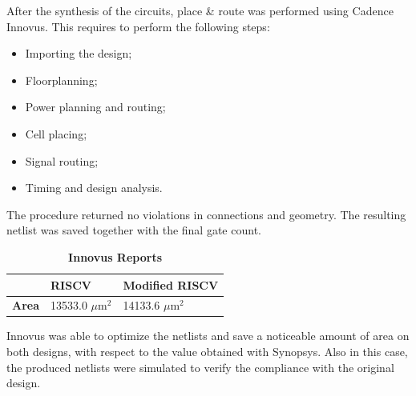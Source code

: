 After the synthesis of the circuits, place \& route was performed using Cadence Innovus. This requires to perform the following steps:

\begin{itemize}
    \item Importing the design;
    \item Floorplanning;
    \item Power planning and routing;
    \item Cell placing;
    \item Signal routing;
    \item Timing and design analysis.
\end{itemize}

The procedure returned no violations in connections and geometry. The resulting netlist was saved together with the final gate count.

\begin{table}[h!]
    \centering
    \begin{tabular}{m{3cm} m{3cm} m{3cm}}
    \hline
         & \textbf{RISCV} & \textbf{Modified RISCV}\\
         \hline
         \textbf{Area} & 13533.0 $\mu$m$^{2}$ & 14133.6 $\mu$m$^{2}$ \\
         \hline
    \end{tabular}
    \caption{\textbf{Innovus Reports}}
    \label{tab:area}
\end{table}

Innovus was able to optimize the netlists and save a noticeable amount of area on both designs, with respect to the value obtained with Synopsys.
Also in this case, the produced netlists were simulated to verify the compliance with the original design.

